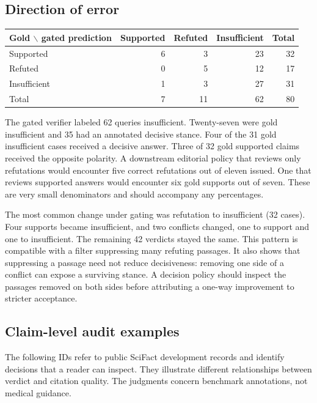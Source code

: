 \subsection{Direction of error}
\begin{center}\small
\begin{tabular}{@{}lrrr|r@{}}\toprule
Gold $\backslash$ gated prediction & Supported & Refuted & Insufficient & Total\\\midrule
Supported & 6 & 3 & 23 & 32\\
Refuted & 0 & 5 & 12 & 17\\
Insufficient & 1 & 3 & 27 & 31\\\midrule
Total & 7 & 11 & 62 & 80\\\bottomrule
\end{tabular}
\end{center}
The gated verifier labeled 62 queries insufficient. Twenty-seven were gold insufficient and 35 had an annotated decisive stance. Four of the 31 gold insufficient cases received a decisive answer. Three of 32 gold supported claims received the opposite polarity. A downstream editorial policy that reviews only refutations would encounter five correct refutations out of eleven issued. One that reviews supported answers would encounter six gold supports out of seven. These are very small denominators and should accompany any percentages.

The most common change under gating was refutation to insufficient (32 cases). Four supports became insufficient, and two conflicts changed, one to support and one to insufficient. The remaining 42 verdicts stayed the same. This pattern is compatible with a filter suppressing many refuting passages. It also shows that suppressing a passage need not reduce decisiveness: removing one side of a conflict can expose a surviving stance. A decision policy should inspect the passages removed on both sides before attributing a one-way improvement to stricter acceptance.

\subsection{Claim-level audit examples}
The following IDs refer to public SciFact development records and identify decisions that a reader can inspect. They illustrate different relationships between verdict and citation quality. The judgments concern benchmark annotations, not medical guidance. \cite{SciFact}

